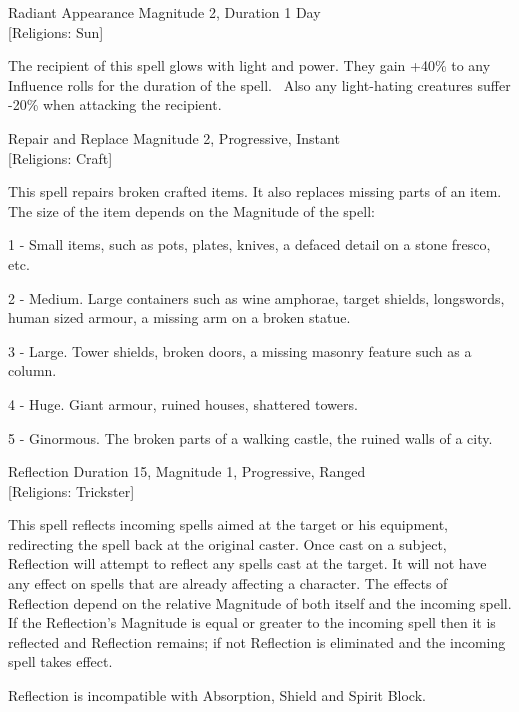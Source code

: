 \begin{samepage}
\begin{rpg-spell}
{Radiant Appearance}
{Magnitude 2, Duration 1 Day\\{[Religions: Sun]}}

The recipient of this spell glows with light and power. They gain +40\% to any Influence rolls for the duration of the spell.  Also any light-hating creatures suffer -20\% when attacking the recipient. 
\end{rpg-spell}
\end{samepage}

\begin{samepage}
\begin{rpg-spell}
{Repair and Replace}
{Magnitude 2, Progressive, Instant\\{[Religions: Craft]}}

This spell repairs broken crafted items. It also replaces missing parts of an item. The size of the item depends on the Magnitude of the spell:
\begin{rpg-list}
\item 1 - Small items, such as pots, plates, knives, a defaced detail on a stone fresco, etc.
\item 2 - Medium. Large containers such as wine amphorae, target shields, longswords, human sized armour, a missing arm on a broken statue.
\item 3 - Large. Tower shields, broken doors, a missing masonry feature such as a column.
\item 4 - Huge. Giant armour, ruined houses, shattered towers.
\item 5 - Ginormous. The broken parts of a walking castle, the ruined walls of a city.
\end{rpg-list}
\end{rpg-spell}
\end{samepage}

\begin{samepage}
\begin{rpg-spell}
{Reflection}
{Duration 15, Magnitude 1, Progressive, Ranged\\{[Religions: Trickster]}}

This spell reflects incoming spells aimed at the target or his equipment, redirecting the spell back at the original caster. Once cast on a subject, Reflection will attempt to reflect any spells cast at the target. It will not have any effect on spells that are already affecting a character. The effects of Reflection depend on the relative Magnitude of both itself and the incoming spell. If the Reflection's Magnitude is equal or greater to the incoming spell then it is reflected and Reflection remains; if not Reflection is eliminated and the incoming spell takes effect. 

Reflection is incompatible with Absorption, Shield and Spirit Block.
\end{rpg-spell}
\end{samepage}

